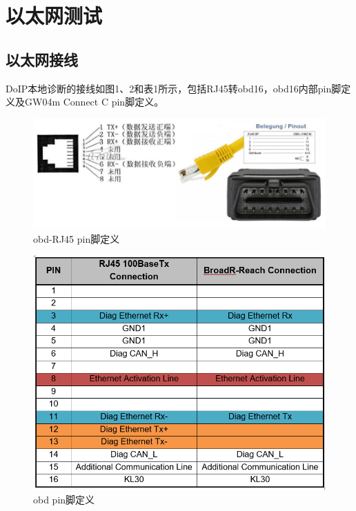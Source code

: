 \section{以太网测试}
\subsection{以太网接线}
DoIP本地诊断的接线如图1、2和表1所示，包括RJ45转obd16，obd16内部pin脚定义及GW04m Connect C pin脚定义。

\begin{figure}[ht]
    \centering
    \includegraphics[scale=0.6]{pic/Quicker_20211111_101031.png}
    \caption{obd-RJ45 pin脚定义}
    \label{fig:Quicker_20211111_101031}
\end{figure}

\begin{figure}[ht]
    \centering
    \includegraphics[scale=0.6]{pic/obd_pin.png}
    \caption{obd pin脚定义}
    \label{fig:obd_pin}
\end{figure}

